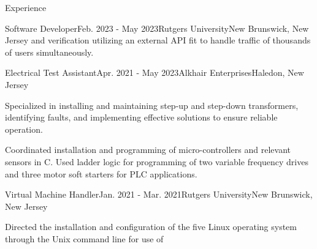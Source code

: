 \documentclass{resume}
\begin{document}
\begin{rSection}{Experience}
\begin{rSubsection}{Software Developer}{Feb. 2023 - May 2023}{Rutgers University}{New Brunswick, New Jersey}
                and verification utilizing an external API fit to handle
                traffic of thousands of users simultaneously.
        \end{rSubsection}
        \begin{rSubsection}{Electrical Test Assistant}{Apr. 2021 - May 2023}{Alkhair Enterprises}{Haledon, New Jersey}
            \item Specialized in installing and maintaining step-up and
                step-down transformers, identifying faults, and implementing
                effective solutions to ensure reliable operation.
            \item Coordinated installation and programming of micro-controllers and relevant sensors in C. Used ladder logic for programming of two variable frequency drives and three motor soft starters for PLC applications.
        \end{rSubsection}
        \begin{rSubsection}{Virtual Machine Handler}{Jan. 2021 - Mar. 2021}{Rutgers University}{New Brunswick, New Jersey}
            \item Directed the installation and configuration of the five Linux
                operating system through the Unix command line for use of

\end{rSubsection}
\end{rSection}
\end{document}
